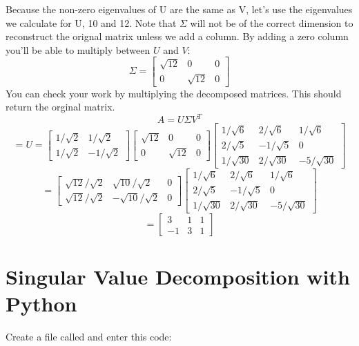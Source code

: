 Because the non-zero eigenvalues of U are the same as V, let's use the eigenvalues we calculate for U, 10 and 12. Note that $\Sigma$ will not be of the correct dimension to reconstruct the orignal matrix unless we add a column. By adding a zero column you'll be able to multiply between $U$ and $V$:
$$
\Sigma = 
\begin{bmatrix}
\sqrt{12} & 0 & 0\\
 0 & \sqrt{12} & 0 
\end{bmatrix}
$$
You can check your work by multiplying the decomposed matrices. This should return the orginal matrix.
$$A = U\Sigma V^T $$
$$ = 
U = \begin{bmatrix}
1/\sqrt{2} & 1/\sqrt{2} \\
1/\sqrt{2} & -1/\sqrt{2} 
\end{bmatrix}
\begin{bmatrix}
\sqrt{12} & 0 & 0\\
 0 & \sqrt{12}  & 0 
\end{bmatrix}
\begin{bmatrix}
1/\sqrt{6} & 2/\sqrt{6} & 1/\sqrt{6} \\
2/\sqrt{5} & -1/\sqrt{5} & 0\\
1/\sqrt{30} & 2/\sqrt{30} & -5/\sqrt{30}
\end{bmatrix}
$$
$$=
\begin{bmatrix}
\sqrt{12}/\sqrt{2} & \sqrt{10}/\sqrt{2} & 0\\
\sqrt{12}/\sqrt{2} & -\sqrt{10}/\sqrt{2} & 0 
\end{bmatrix}
\begin{bmatrix}
1/\sqrt{6} & 2/\sqrt{6} & 1/\sqrt{6}\\
2/\sqrt{5} & -1/\sqrt{5} & 0 \\
1/\sqrt{30} & 2/\sqrt{30} & -5/\sqrt{30}
\end{bmatrix}
$$
$$
=
\begin{bmatrix}
3 & 1 & 1 \\
-1 & 3 & 1 
\end{bmatrix}
$$ 

\section{Singular Value Decomposition with Python}
Create a file called  and enter this code:

